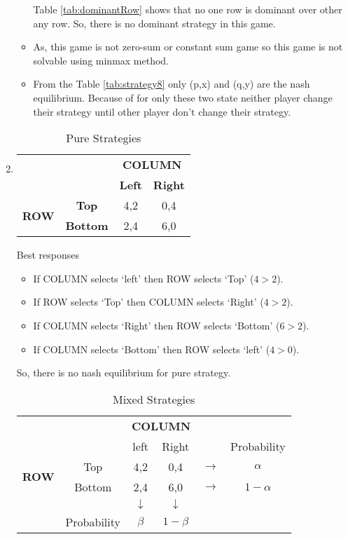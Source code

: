 \documentclass[a4paper,12pt]{article}
\begin{document}
\begin{enumerate}
\begin{itemize}
Table \ref{tab:dominantRow} shows that no one row is dominant over other any row. So, there is no dominant strategy in this game.
\item
As, this game is not zero-sum or constant sum game so this game is not solvable using minmax method.
\item From the Table \ref{tab:strategy8} only (p,x) and (q,y) are the nash equilibrium. Because of for only these two state neither player change their strategy until other player don't change their strategy.
\end{itemize}
\item%
 \begin{table}[H]
 \centering
\begin{tabular}{@{}cccc@{}}
\toprule
\multicolumn{2}{c}{} & \multicolumn{2}{c}{\bfseries COLUMN}\\
\multicolumn{2}{c}{} & \textbf{Left} & \textbf{Right}\\
\multirow{2}{*}{\bfseries ROW} & \textbf{Top} & 4,2 & 0,4\\
 & \textbf{Bottom} & 2,4 & 6,0\\
 \bottomrule
\end{tabular}
\caption{Pure Strategies}
\end{table}

Best responses
\begin{itemize}
\item If COLUMN selects `left' then ROW selects `Top' ($4>2$).
\item If ROW selects `Top' then COLUMN selects `Right' ($4>2$).
\item If COLUMN selects `Right' then ROW selects `Bottom' ($6>2$).
\item If COLUMN selects `Bottom' then ROW selects `left' ($4>0$).
\end{itemize}
So, there is no nash equilibrium for pure strategy.

 \begin{table}[H]
 \centering
\begin{tabular}{@{}cccccc@{}}
\toprule
\multicolumn{2}{c}{} & \multicolumn{2}{c}{\bfseries COLUMN}\\
\multicolumn{2}{c}{} & left & Right & & Probability\\
\multirow{2}{*}{\bfseries ROW} & Top & 4,2 & 0,4 & $\rightarrow$ & $\alpha$\\
 & Bottom & 2,4 & 6,0 & $\rightarrow$ & $1-\alpha$\\
 & & $\downarrow$ & $\downarrow$ & \\
 & Probability & $\beta$ & $1-\beta$ &\\
 \bottomrule
\end{tabular}
\caption{Mixed Strategies}
\end{table}


\end{enumerate}
\end{document}
